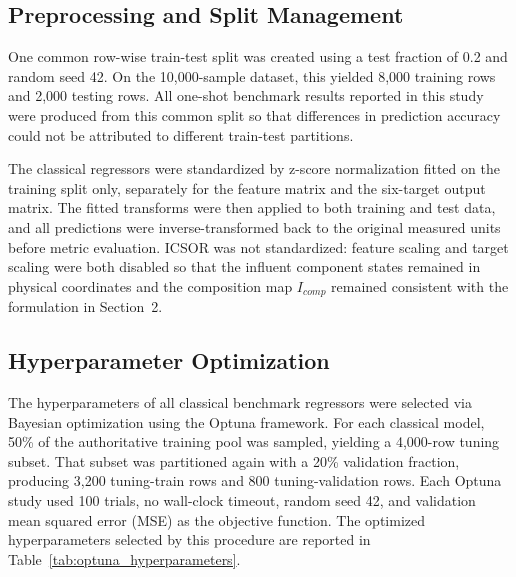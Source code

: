 \documentclass[11pt]{article}
\begin{document}
\subsection{Preprocessing and Split Management}

One common row-wise train-test split was created using a test fraction of 0.2 and random seed 42. On the 10,000-sample dataset, this yielded 8,000 training rows and 2,000 testing rows. All one-shot benchmark results reported in this study were produced from this common split so that differences in prediction accuracy could not be attributed to different train-test partitions.

The classical regressors were standardized by z-score normalization fitted on the training split only, separately for the feature matrix and the six-target output matrix. The fitted transforms were then applied to both training and test data, and all predictions were inverse-transformed back to the original measured units before metric evaluation. ICSOR was not standardized: feature scaling and target scaling were both disabled so that the influent component states remained in physical coordinates and the composition map $I_{comp}$ remained consistent with the formulation in Section~2.

\subsection{Hyperparameter Optimization}

The hyperparameters of all classical benchmark regressors were selected via Bayesian optimization using the Optuna framework. For each classical model, 50\% of the authoritative training pool was sampled, yielding a 4,000-row tuning subset. That subset was partitioned again with a 20\% validation fraction, producing 3,200 tuning-train rows and 800 tuning-validation rows. Each Optuna study used 100 trials, no wall-clock timeout, random seed 42, and validation mean squared error (MSE) as the objective function. The optimized hyperparameters selected by this procedure are reported in Table~\ref{tab:optuna_hyperparameters}.
\end{document}
